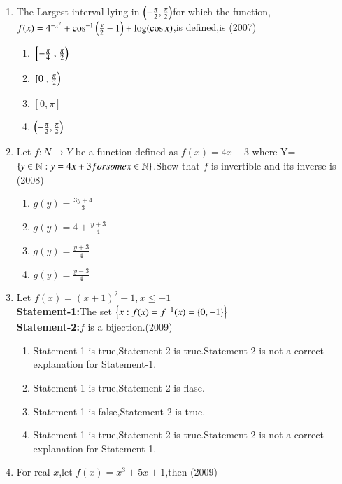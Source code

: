 \documentclass[journal,12pt,twocolumn]{IEEEtran}
\theoremstyle{remark}
\begin{document}
\begin{enumerate}[start=4]
     \item The Largest interval lying in $\left(-\frac{\pi}{2},\frac{\pi}{2}\right)$for which the function,
	     $f(x)=4^{-x^{2}}+\cos^{-1}\left(\frac{x}{2}-1\right)+\log(\cos{x})$,is defined,is \hfill(2007)
	     \begin{enumerate}
		     \item ${}\left[-\frac{\pi}{4}\right.,\left.\frac{\pi}{2}\right)$ \\
		     \item ${}\left[0\right.,\left.\frac{\pi}{2}\right)$ \\
		     \item $[0,\pi]$ \\
		     \item $\left(-\frac{\pi}{2},\frac{\pi}{2}\right)$
	     \end{enumerate}
     \item Let $f:N\to Y$ be a function defined as $f(x)=4x+3$ where Y=$\left\{y\in \mathbb{N}:y=4x+3 for some x\in \mathbb{N}\right\}$.Show that $f$ is invertible and its inverse is \hfill(2008)
	     \begin{enumerate}
		     \item $g(y)=\frac{3y+4}{3}$ \\
		     \item $g(y)=4+\frac{y+3}{4}$ \\
		     \item $g(y)=\frac{y+3}{4}$ \\
		     \item $g(y)=\frac{y-3}{4}$
	     \end{enumerate}
     \item Let $f(x)=(x+1)^{2}-1,x\leq-1$\\
	     \textbf{Statement-1:}The set $\left\{x:f(x)=f^{-1}(x)=\left\{0,-1\right\}\right\}$\\
	     \textbf{Statement-2:}$f$ is a bijection.\hfill(2009)
	     \begin{enumerate}
		     \item Statement-1 is true,Statement-2 is true.Statement-2 is  not a correct explanation for Statement-1.
		     \item Statement-1 is true,Statement-2 is flase.
		     \item Statement-1 is false,Statement-2 is true.
		     \item Statement-1 is true,Statement-2 is true.Statement-2 is not a correct explanation for Statement-1.
	     \end{enumerate}
     \item For real $x$,let $f(x)=x^{3}+5x+1$,then \hfill(2009)

\end{enumerate}
\end{document}
